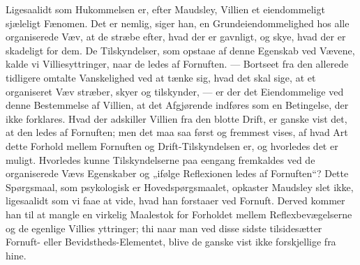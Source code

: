 \documentclass[12pt,a4paper,openany]{book}
\newcommand{\opage}[1]{\marginnote{\footnotesize\textit{[#1]}}}
\begin{document}
Ligesaalidt som Hukommelsen er, efter Maudsley, Villien
et eiendommeligt sjæleligt Fænomen. Det er nemlig, siger
han, en Grundeiendommelighed hos alle organiserede Væv,
at de stræbe efter, hvad der er gavnligt, og skye, hvad
der er skadeligt for dem. De Tilskyndelser, som opstaae af
denne Egenskab ved Vævene, kalde vi Villiesyttringer, naar
de ledes af Fornuften. --- Bortseet fra den allerede tidligere
omtalte Vanskelighed ved at tænke sig, hvad det skal sige, at
et organiseret Væv stræber, skyer og tilskynder, --- er der
det Eiendommelige ved denne Bestemmelse af Villien, at det
Afgjørende indføres som en Betingelse, der ikke forklares.
Hvad der adskiller Villien fra den blotte Drift, er ganske
vist det, at den ledes af Fornuften; men det maa saa først
og fremmest vises, af hvad Art dette Forhold mellem Fornuften
og Drift-Tilskyndelsen er, og hvorledes det er muligt.
Hvorledes kunne Tilskyndelserne paa eengang fremkaldes ved
de organiserede Vævs Egenskaber og „ifølge Reflexionen
ledes af Fornuften“? Dette Spørgsmaal, som psykologisk
er Hovedspørgsmaalet, opkaster Maudsley slet ikke, ligesaalidt
som vi faae at vide, hvad han forstaaer ved Fornuft. Derved
kommer han til at mangle en virkelig Maalestok for
Forholdet mellem Reflexbevægelserne og de egenlige Villies%
\opage{321}yttringer; thi naar man ved disse sidste tilsidesætter Fornuft-
eller Bevidstheds-Elementet, blive de ganske vist ikke
forskjellige fra hine.
\end{document}
